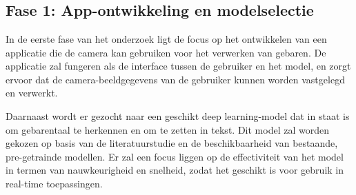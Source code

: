 
\chapter{}%
\label{ch:methodologie}


\section{Fase 1: App-ontwikkeling en modelselectie}
In de eerste fase van het onderzoek ligt de focus op het ontwikkelen van een applicatie die de camera kan gebruiken voor het verwerken van gebaren. De applicatie zal fungeren als de interface tussen de gebruiker en het model, en zorgt ervoor dat de camera-beeldgegevens van de gebruiker kunnen worden vastgelegd en verwerkt.

Daarnaast wordt er gezocht naar een geschikt deep learning-model dat in staat is om gebarentaal te herkennen en om te zetten in tekst. Dit model zal worden gekozen op basis van de literatuurstudie en de beschikbaarheid van bestaande, pre-getrainde modellen. Er zal een focus liggen op de effectiviteit van het model in termen van nauwkeurigheid en snelheid, zodat het geschikt is voor gebruik in real-time toepassingen.

